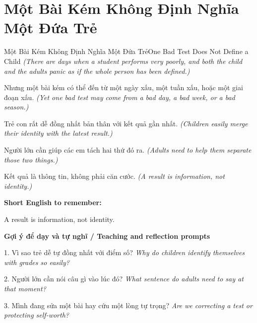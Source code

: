 \section{Một Bài Kém Không Định Nghĩa Một Đứa Trẻ}
\begin{truyen}{Một Bài Kém Không Định Nghĩa Một Đứa Trẻ}{One Bad Test Does Not Define a Child}
\textit{(There are days when a student performs very poorly, and both the child and the adults panic as if the whole person has been defined.)}

Nhưng một bài kém có thể đến từ một ngày xấu, một tuần xấu, hoặc một giai đoạn xấu.
\textit{(Yet one bad test may come from a bad day, a bad week, or a bad season.)}

Trẻ con rất dễ đồng nhất bản thân với kết quả gần nhất.
\textit{(Children easily merge their identity with the latest result.)}

Người lớn cần giúp các em tách hai thứ đó ra.
\textit{(Adults need to help them separate those two things.)}

\end{truyen}

\begin{baihoc}
Kết quả là thông tin, không phải căn cước.
\textit{(A result is information, not identity.)}
\end{baihoc}

\begin{ghinhoanh}
\textbf{Short English to remember:}

A result is information, not identity.

\end{ghinhoanh}

\begin{tuhocnhanh}
\textbf{Gợi ý để dạy và tự nghĩ / Teaching and reflection prompts}

1. Vì sao trẻ dễ tự đồng nhất với điểm số? \textit{Why do children identify themselves with grades so easily?}

2. Người lớn cần nói câu gì vào lúc đó? \textit{What sentence do adults need to say at that moment?}

3. Mình đang sửa một bài hay cứu một lòng tự trọng? \textit{Are we correcting a test or protecting self-worth?}
\end{tuhocnhanh}
\ngancach


